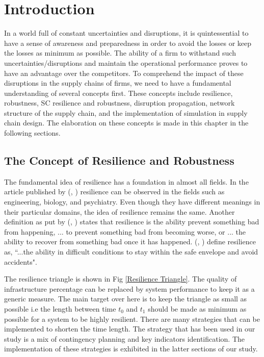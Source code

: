 \chapter{Introduction} \label{ch:introduction}
 In a world full of constant uncertainties and disruptions, it is quintessential to have a sense of awareness and preparedness in order to avoid the losses or keep the losses as minimum as possible. The ability of a firm to withstand such uncertainties/disruptions and maintain the operational performance proves to have an advantage over the competitors. To comprehend the impact of these disruptions in the supply chains of firms, we need to have a fundamental understanding of several concepts first. These concepts include resilience, robustness, SC resilience and robustness, disruption propagation, network structure of the supply chain, and the implementation of simulation in supply chain design. The elaboration on these concepts is made in this chapter in the following sections.

\section{The Concept of Resilience and Robustness}
The fundamental idea of resilience has a foundation in almost all fields. In the article published by (\citeauthor{Boin2010}, \citeyear{Boin2010}) resilience can be observed in the fields such as engineering, biology, and psychiatry. Even though they have different meanings in their particular domains, the idea of resilience remains the same. Another definition as put by (\citeauthor{Westrum2006}, \citeyear{Westrum2006}) states that resilience is the ability prevent something bad from happening, ... to prevent something bad from becoming worse, or ... the ability to recover from something bad once it has happened.  (\citeauthor{HaleA.&Heijer2006}, \citeyear{HaleA.&Heijer2006}) define resilience as, ``...the ability in difficult conditions to stay within the safe envelope and avoid accidents". 

The resilience triangle is shown in Fig \ref{Resilience Triangle}. The quality of infrastructure percentage can be replaced by system performance to keep it as a generic measure. The main target over here is to keep the triangle as small as possible i.e the length between time $t_{\text{0}}$ and $t_{\text{1}}$ should be made as minimum as possible for a system to be highly resilient. There are many strategies that can be implemented to shorten the time length. The strategy that has been used in our study is a mix of contingency planning and key indicators identification. The implementation of these strategies is exhibited in the latter sections of our study.


